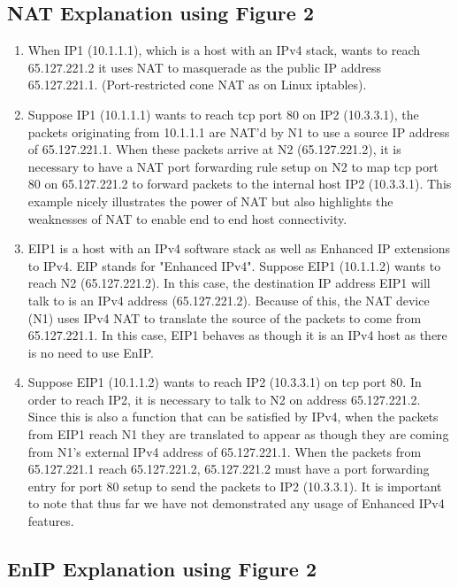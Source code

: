 \subsection{NAT Explanation using Figure 2}
\begin{enumerate}
 \item When IP1 (10.1.1.1), which is a host with an IPv4 stack, wants to reach 65.127.221.2 it 
  uses NAT to masquerade as the public IP address 65.127.221.1. 
  (Port-restricted cone NAT as on Linux iptables).

 \item Suppose IP1 (10.1.1.1) wants to reach tcp port 80 on IP2 (10.3.3.1), 
the packets originating from 10.1.1.1 are NAT'd by N1 to use a source IP 
address of 65.127.221.1. When these packets arrive at N2 (65.127.221.2), it is necessary 
to have a NAT port forwarding rule setup on N2 to map tcp port 80 on 65.127.221.2 
to forward packets to the internal host IP2 (10.3.3.1). This example nicely 
illustrates the power of NAT but also highlights the weaknesses of NAT to 
enable end to end host connectivity.

 \item EIP1 is a host with an IPv4 software 
stack as well as Enhanced IP extensions to IPv4. EIP stands for "Enhanced IPv4". 
Suppose EIP1 (10.1.1.2) wants to reach N2 (65.127.221.2). In this case, the 
destination IP address EIP1 will talk to is an IPv4 address (65.127.221.2). 
Because of this, the NAT device (N1) uses IPv4 NAT to translate the 
source of the packets to come from 65.127.221.1. In this case, EIP1 
behaves as though it is an IPv4 host as there is no need to use EnIP.

 \item Suppose EIP1 (10.1.1.2) wants to reach IP2 (10.3.3.1) on 
tcp port 80. In order to reach IP2, it is necessary to talk to 
N2 on address 65.127.221.2. Since this is also a function that can 
be satisfied by IPv4, when the packets from EIP1 reach N1 they 
are translated to appear as though they are coming from N1's 
external IPv4 address of 65.127.221.1. When the packets from 65.127.221.1 
reach 65.127.221.2, 65.127.221.2 must have a port forwarding entry for 
port 80 setup to send the packets to IP2 (10.3.3.1). 
It is important to note that thus far we have not demonstrated 
any usage of Enhanced IPv4 features.
\end{enumerate}

\subsection{EnIP Explanation using Figure 2}

